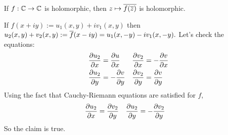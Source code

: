 \documentclass{homework}
\begin{document}
                                                                                                             \begin{problem}\label{schwarz-reflection-principle}
                                                                                                             If $f : \mathbb{C} \to \mathbb{C}$ is holomorphic, then $z \mapsto \overline{f(\overline{z})}$ is holomorphic.
                                                                                                             \end{problem}
                                                                                                             \begin{solution}
                                                                                                             If $f(x+iy) := u_1(x, y) + iv_1(x, y)$ then $ u_2(x, y) + v_2(x, y) := \overline{f}(x - iy) = u_1(x, -y) - iv_1(x, -y).$ Let's check the equations:
                                                                                                             \begin{align*}
                                                                                                             \frac{\partial u_2}{\partial x} &= \frac{\partial u}{\partial x} &
                                                                                                             \frac{\partial v_2}{\partial x} &= -\frac{\partial v}{\partial x}\\
                                                                                                             \frac{\partial u_2}{\partial y} &= -\frac{\partial v}{\partial y} & 
                                                                                                             \frac{\partial v_2}{\partial y} &= \frac{\partial v}{\partial y}\\
                                                                                                             \end{align*}
                                                                                                             Using the fact that Cauchy-Riemann equations are satisfied for $f$,
                                                                                                             \begin{align*}
                                                                                                             \frac{\partial u_2}{\partial x} &= \frac{\partial v_2}{\partial y} & 
                                                                                                             \frac{\partial u_2}{\partial y} &= -\frac{\partial v_2}{\partial y}
                                                                                                             \end{align*}
                                                                                                             So the claim is true.
                                                                                                             \end{solution}
\end{document}
